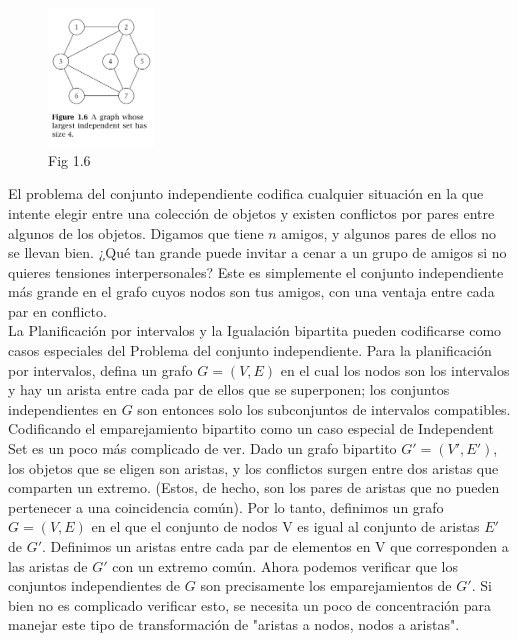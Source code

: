 \documentclass[a4paper]{article}
\begin{document}
\begin{figure}
\includegraphics[width=0.25\textwidth]{Imagenes-Seccion1/fig1-6.PNG}
\caption{ Fig 1.6}
 \label{fig:Imagenes-Seccion1/fig1-6.PNG}
\end{figure}

El problema del conjunto independiente codifica cualquier situación en la que intente elegir entre una colección de objetos y existen conflictos por pares entre algunos de los objetos. Digamos que tiene $n$ amigos, y algunos pares de ellos no se llevan bien. ¿Qué tan grande puede invitar a cenar a un grupo de amigos si no quieres tensiones interpersonales? Este es simplemente el conjunto independiente más grande en el grafo cuyos nodos son tus amigos, con una ventaja entre cada par en conflicto.\\

La Planificación por intervalos y la Igualación bipartita pueden codificarse como casos especiales del Problema del conjunto independiente. Para la planificación por intervalos, defina un grafo $G=(V,E)$ en el cual los nodos son los intervalos y hay un arista entre cada par de ellos que se superponen; los conjuntos independientes en $G$ son entonces solo los subconjuntos de intervalos compatibles. Codificando el emparejamiento bipartito como un caso especial de Independent Set es un poco más complicado de ver. Dado un grafo bipartito $G'=(V',E')$, los objetos que se eligen son aristas, y los conflictos surgen entre dos aristas que comparten un extremo. (Estos, de hecho, son los pares de aristas que no pueden pertenecer a una coincidencia común). Por lo tanto, definimos un grafo $G=(V,E)$ en el que el conjunto de nodos V es igual al conjunto de aristas $E'$ de $G'$. Definimos un aristas entre cada par de elementos en V que corresponden a las aristas de $G'$ con un extremo común. Ahora podemos verificar que los conjuntos independientes de $G$ son precisamente los emparejamientos de $G'$. Si bien no es complicado verificar esto, se necesita un poco de concentración para manejar este tipo de transformación de "aristas a nodos, nodos a aristas".\\
\end{document}
